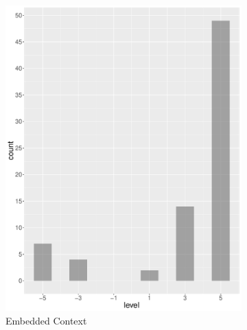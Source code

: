 \begin{figure}
\begin{subfigure}[b]{0.4\textwidth}
        \includegraphics[width=\textwidth]{plots/finance/hist_level_ec}
        \caption{Embedded Context}
        \label{fig:hist_level_finance_ec}
    \end{subfigure}
    ~
    \begin{subfigure}[b]{0.4\textwidth}

\end{subfigure}
\end{figure}

